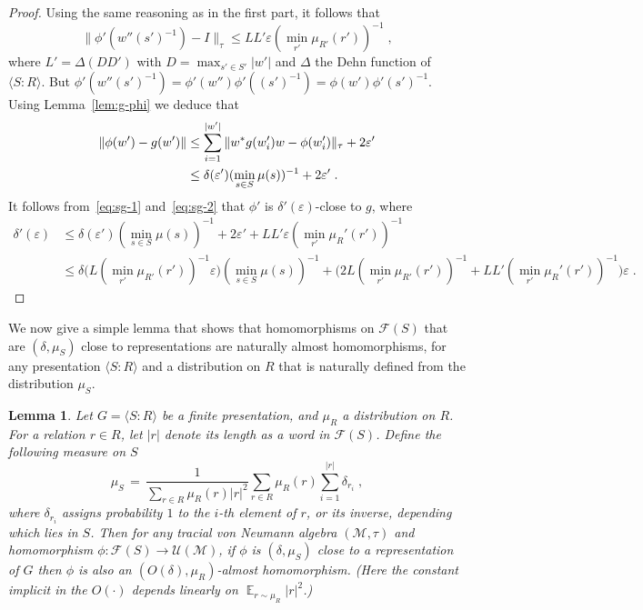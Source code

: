 \documentclass[11pt]{article}
\newtheorem{lemma}[theorem]{Lemma}
\theoremstyle{definition}
\DeclareMathOperator*{\Expectation}{\mathbb{E}}
\newcommand{\Es}[1]{\Expectation_{#1}}
\newcommand{\cM}{\ensuremath{\mathcal{M}}}
\newcommand{\eps}{\varepsilon}
\begin{document}
\begin{proof}
Using the same reasoning as in the first part, it follows that 
\begin{equation}\label{eq:sg-1}
   \|\phi'(w''(s')^{-1})-I\|_\tau \leq LL' \eps (\min_{r'}\mu_{R'}(r'))^{-1}\;,
\end{equation}
where $L'=\Delta(DD')$ with $D=\max_{s'\in S'}|w'|$ and $\Delta$ the Dehn function of $\langle S:R\rangle$.
 But $\phi'(w''(s')^{-1}) = \phi'(w'')\phi'((s')^{-1})=\phi(w')\phi'(s')^{-1}$. Using Lemma~\ref{lem:g-phi} we deduce that 
\begin{align}
 \|\phi(w')-g(w')\| &\leq \sum_{i=1}^{|w'|}  \| w^* g(w'_i)w -\phi(w'_i)\|_\tau + 2\eps'\notag\\
 &\leq \delta(\eps')  (\min_{s\in S} \mu(s))^{-1} + 2\eps'\;.\label{eq:sg-2}
\end{align}
It follows from~\eqref{eq:sg-1} and~\eqref{eq:sg-2} that $\phi'$ is $\delta'(\eps)$-close to $g$, where 
\begin{align*}
\delta'(\eps) &\leq \delta(\eps')  (\min_{s\in S} \mu(s))^{-1}  + 2\eps'  +  LL' \eps (\min_{r'}\mu_R'(r'))^{-1}\\
&\leq  \delta\big(L(\min_{r'}\mu_{R'}(r'))^{-1}\eps\big)  (\min_{s\in S} \mu(s))^{-1}  + \big(2 L (\min_{r'}\mu_{R'}(r'))^{-1} +  LL'  (\min_{r'}\mu_R'(r'))^{-1}\big)\eps
\;.
\end{align*}
\end{proof}

We now give a simple lemma that shows that homomorphisms on $\mathcal{F}(S)$ that are $(\delta,\mu_S)$ close to representations are naturally almost homomorphisms, for any presentation $\langle S:R\rangle$ and a distribution on $R$ that is naturally defined from the distribution $\mu_S$.


\begin{lemma}\label{lem:l1}
  Let $G=\langle S:R\rangle$ be a finite presentation, and $\mu_R$ a distribution on $R$. For a relation $r\in R$, let $|r|$ denote its length as a word in $\mathcal{F}(S)$. Define the following measure on $S$
  \begin{equation}\label{eq:mus}
     \mu_S \,=\, \frac{1}{\sum_{r\in R} \mu_R(r)|r|^2} \sum_{r\in R} \mu_R(r) \sum_{i=1}^{|r|} \delta_{r_i}\;,
  \end{equation}
  where $\delta_{r_i}$ assigns probability $1$ to the $i$-th element of $r$, or its inverse, depending which lies in $S$. Then for any tracial von Neumann algebra $(\cM,\tau)$ and homomorphism $\phi:\mathcal{F}(S)\to \mathcal{U}(\cM)$, if $\phi$ is $(\delta,\mu_S)$ close to a representation of $G$ then $\phi$ is also an $(O(\delta),\mu_R)$-almost homomorphism. (Here the constant implicit in the $O(\cdot)$ depends linearly on $\Es{r\sim \mu_R}|r|^2$.)
  \end{lemma}
  
\end{document}
